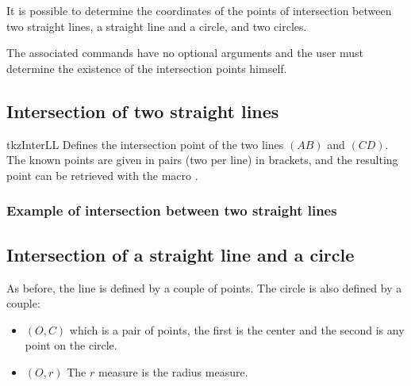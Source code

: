 \section{}

It is possible to determine the coordinates of the points of intersection between two straight lines, a straight line and a circle, and two circles.

The associated commands have no optional arguments and the user must determine the existence of the intersection points himself.

\subsection{Intersection of two straight lines }
\begin{NewMacroBox}{tkzInterLL}{}%
Defines the intersection point  of the two lines $(AB)$ and $(CD)$. The known points are given in pairs (two per line) in brackets, and the resulting point can be retrieved with the macro .
\end{NewMacroBox}

\subsubsection{Example of intersection between two straight lines}

\begin{tkzexample}[latex=7cm,small]
\end{tkzexample}

\subsection{Intersection of a straight line and a circle  }

As before, the line is defined by a couple of points. The circle
 is also defined by a couple:
\begin{itemize}
\item $(O,C)$ which is a pair of points, the first is the center and the second is any point on the circle.
\item $(O,r)$  The $r$ measure is the radius measure.
\end{itemize}

